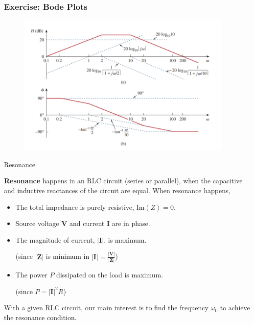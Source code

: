 \documentclass{beamer}
\begin{document}

\begin{frame}
\frametitle{Exercise: Bode Plots}
\begin{figure}[H]
        \centering
        \includegraphics[width=0.95\textwidth]{C14/a3.png}
    \end{figure}
\end{frame}


\begin{frame}{Resonance}

\textbf{Resonance} happens in an RLC circuit (series or parallel), when the capacitive and inductive reactances of the circuit are equal. When resonance happens,
\begin{itemize}
    \item The total impedance is purely resistive, $\mathrm{Im}(Z)=0$.
    \item Source voltage $\mathbf{V}$ and current $\mathbf{I}$ are in phase.
    \item The magnitude of current, $\vert \mathbf{I}\vert$, is maximum. 

        (since $\vert \mathbf{Z}\vert$ is minimum in $\vert \mathbf{I}\vert = \frac{\vert \mathbf{V}\vert}{\vert \mathbf{Z}\vert}$)
    \item The power $P$ dissipated on the load is maximum.

        (since $P = \vert \mathbf{I}\vert ^2R$)
\end{itemize}

With a given RLC circuit, our main interest is to find the frequency $\omega_0$ to achieve the resonance condition.

    
\end{frame}
\end{document}
